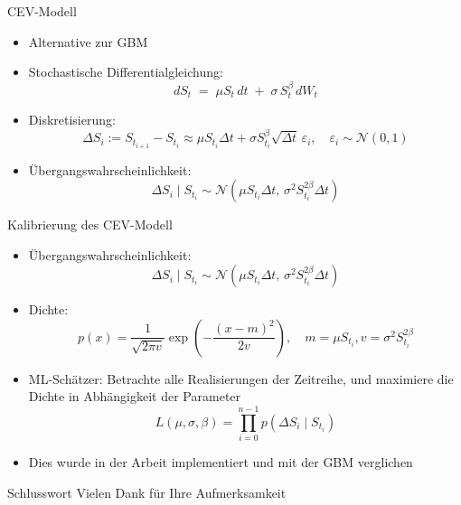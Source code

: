 \documentclass{beamer}
\begin{document}
\begin{frame}{CEV-Modell}
  \begin{itemize}
    \item Alternative zur GBM
    \item Stochastische Differentialgleichung: $$dS_t \;=\; \mu S_t\,dt \;+\; \sigma\,S_t^{\beta}\,dW_t$$
    \item Diskretisierung: $$\Delta S_i := S_{t_{i+1}} - S_{t_i} \approx \mu S_{t_i}\Delta t + \sigma S_{t_i}^{\beta}\sqrt{\Delta t}\,\varepsilon_i,\quad \varepsilon_i\sim\mathcal N(0,1)$$
    \item Übergangswahrscheinlichkeit: $$\Delta S_i \mid S_{t_i} \sim \mathcal N\left(\mu S_{t_i} \Delta t,\, \sigma^2 S_{t_i}^{2\beta} \Delta t\right)$$
  \end{itemize}
\end{frame}

\begin{frame}{Kalibrierung des CEV-Modell}
  \begin{itemize}
    \item Übergangswahrscheinlichkeit: $$\Delta S_i \mid S_{t_i} \sim \mathcal N\left(\mu S_{t_i} \Delta t,\, \sigma^2 S_{t_i}^{2\beta} \Delta t\right)$$
    \item Dichte: $$p(x) = \frac{1}{\sqrt{2\pi v}} \exp\left(-\frac{(x-m)^2}{2v}\right),\quad m = \mu S_{t_i}, v = \sigma^2 S_{t_i}^{2 \beta}$$
    \item ML-Schätzer: Betrachte alle Realisierungen der Zeitreihe, und maximiere die Dichte in Abhängigkeit der Parameter
  $$L(\mu, \sigma, \beta) = \prod_{i=0}^{n-1} p(\Delta S_i \mid S_{t_i})$$
    \item Dies wurde in der Arbeit implementiert und mit der GBM verglichen
  \end{itemize}
\end{frame}

\begin{frame}{Schlusswort}
  \centering
  \Huge Vielen Dank für Ihre Aufmerksamkeit\\
\end{frame}
\end{document}

